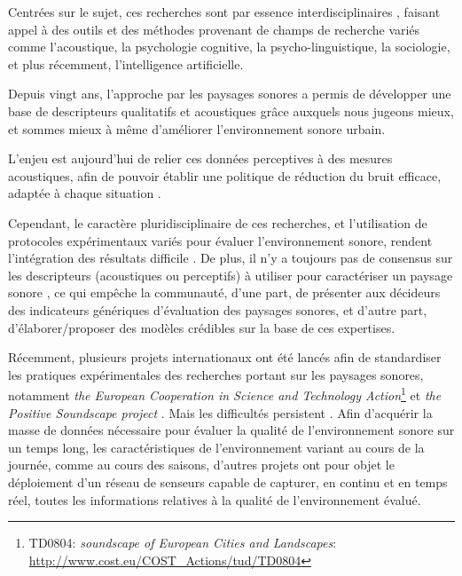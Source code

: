 Centrées sur le sujet, ces recherches sont par essence interdisciplinaires \citep{davies2013perception,aletta2016soundscape}, faisant appel à des outils et des méthodes provenant de champs de recherche variés comme l'acoustique, la psychologie cognitive, la psycho-linguistique, la sociologie, et plus récemment, l’intelligence artificielle.

Depuis vingt ans, l'approche par les paysages sonores a permis de développer une base de descripteurs qualitatifs et acoustiques grâce auxquels nous jugeons mieux, et sommes mieux à même d'améliorer l'environnement sonore urbain. \citep{kang2006urban,schulte2007soundscape}

L'enjeu est aujourd'hui de relier ces données perceptives à des mesures acoustiques, afin de pouvoir établir une politique de réduction du bruit efficace, adaptée à chaque situation \citep{schulte2013soundscape}.

Cependant, le caractère pluridisciplinaire de ces recherches, et l'utilisation de protocoles expérimentaux variés pour évaluer l'environnement sonore, rendent l’intégration des résultats difficile \citep{davies2013perception}. De plus, il n'y a toujours pas de consensus sur les descripteurs (acoustiques ou perceptifs) à utiliser pour caractériser un paysage sonore \citep{brocolini2012prediction,aletta2016soundscape}, ce qui empêche la communauté, d'une part, de présenter aux décideurs des indicateurs génériques d'évaluation des paysages sonores, et d'autre part, d'élaborer/proposer des modèles crédibles sur la base de ces expertises.

Récemment, plusieurs projets internationaux ont été lancés afin de standardiser les pratiques expérimentales des recherches portant sur les paysages sonores, notamment \emph{the European Cooperation in Science and Technology Action}\footnote{TD0804: \emph{soundscape of European Cities and Landscapes}: \url{http://www.cost.eu/COST_Actions/tud/TD0804}} \citep{schulte2010soundscape} et \emph{the Positive Soundscape project} \citep{salford2106,davies2013perception}. Mais les difficultés persistent \citep{schulte2013soundscape,ribeiro2013heart}. Afin d'acquérir la masse de données nécessaire pour évaluer la qualité de l'environnement sonore sur un temps long, les caractéristiques de l'environnement variant au cours de la journée, comme au cours des saisons, d'autres projets \citep{park14} ont pour objet le déploiement d'un réseau de senseurs capable de capturer, en continu et en temps réel, toutes les informations relatives à la qualité de l’environnement évalué.

